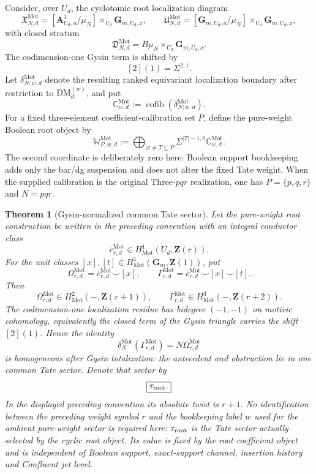 \documentclass[11pt]{article}
\newtheorem{theorem}{Theorem}[section]
\theoremstyle{remark}
\newcommand{\Z}{\mathbf Z}
\newcommand{\cofib}{\operatorname{cofib}}
\newcommand{\DM}{\mathrm{DM}}
\newcommand{\Mot}{\mathrm{Mot}}
\begin{document}
Consider, over $U_d$, the cyclotomic root localization diagram
\[
 \mathfrak X^{\Mot}_{N,d}
 =[\mathbf A^1_{U_d,u}/\mu_N]
   \times_{U_d}\mathbf G_{m,U_d,x},
 \qquad
 \mathfrak U^{\Mot}_{N,d}
 =[\mathbf G_{m,U_d,u}/\mu_N]
   \times_{U_d}\mathbf G_{m,U_d,x},
\]
with closed stratum
\[
 \mathfrak D^{\Mot}_{N,d}
 =B\mu_N\times_{U_d}\mathbf G_{m,U_d,x}.
\]
The codimension-one Gysin term is shifted by
\begin{equation}\label{P2M-eq:v32-gysin-bidegree}
 \boxed{[2](1)=\Sigma^{2,1}.}
\end{equation}
Let $\delta_{N;w,d}^{\Mot}$ denote the resulting ranked equivariant
localization boundary after restriction to $\DM_d^{(w)}$, and put
\begin{equation}
 \boxed{
 \mathbb C^{\Mot}_{w,d}:=\cofib(\delta_{N;w,d}^{\Mot}).}
\end{equation}
For a fixed three-element coefficient-calibration set $P$, define the
pure-weight Boolean root object by
\begin{equation}
 \boxed{
 \mathbb W^{\Mot}_{P,w,d}
 :=\bigoplus_{\varnothing\ne T\subseteq P}
   \Sigma^{|T|-1,0}\mathbb C^{\Mot}_{w,d}.}
\end{equation}
The second coordinate is deliberately zero here: Boolean support bookkeeping
adds only the bar/dg suspension and does not alter the fixed Tate weight.
When the supplied calibration is the original Three-$pqr$ realization, one
has $P=\{p,q,r\}$ and $N=pqr$.

\begin{theorem}[Gysin-normalized common Tate sector]
\label{P2M-thm:root-common-tate-sector}
Let the pure-weight root construction be written in the preceding convention
with an integral conductor class
\[
 \overline c^{\Mot}_{r,d}\in H^1_{\Mot}(U_d,\Z(r)).
\]
For the unit classes $[x],[t]\in H^1_{\Mot}(\mathbf G_m,\Z(1))$, put
\[
 \Omega^{\Mot}_{r,d}=\overline c^{\Mot}_{r,d}\smile[x],
 \qquad
 \Gamma^{\Mot}_{r,d}=\overline c^{\Mot}_{r,d}\smile[x]\smile[t].
\]
Then
\[
 \Omega^{\Mot}_{r,d}\in H^2_{\Mot}(-,\Z(r+1)),
 \qquad
 \Gamma^{\Mot}_{r,d}\in H^3_{\Mot}(-,\Z(r+2)).
\]
The codimension-one localization residue has bidegree $(-1,-1)$ on motivic
cohomology, equivalently the closed term of the Gysin triangle carries the
shift $[2](1)$.  Hence the identity
\[
 \delta_N^{\Mot}(\Gamma^{\Mot}_{r,d})=N\Omega^{\Mot}_{r,d}
\]
is homogeneous after Gysin totalization: the antecedent and obstruction lie in
one common Tate sector.  Denote that sector by
\[
 \boxed{\tau_{\rm root}.}
\]
In the displayed preceding convention its absolute twist is $r+1$.  No
identification between the preceding weight symbol $r$ and the bookkeeping label
$w$ used for the ambient pure-weight sector is required here: $\tau_{\rm root}$
is the Tate sector actually selected by the cyclic root object.  Its
value is fixed by the root coefficient object and is independent
of Boolean support, exact-support channel, insertion history and Confluent jet
level.
\end{theorem}
\end{document}
